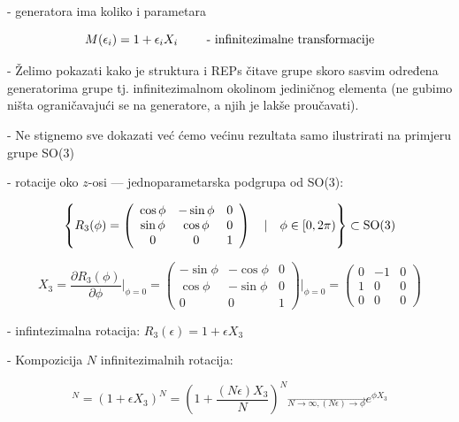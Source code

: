 - generatora ima koliko i parametara

\begin{displaymath}
  M(\epsilon_i)=1 + \epsilon_i X_i \qquad \textrm{ -
  infinitezimalne transformacije}
\end{displaymath}

- Želimo pokazati kako je struktura i REPs čitave grupe skoro sasvim
određena generatorima grupe tj. infinitezimalnom okolinom jediničnog 
elementa (ne gubimo ništa ograničavajući se na generatore, a njih
je lakše proučavati).

- Ne stignemo sve dokazati već ćemo većinu rezultata samo ilustrirati
  na primjeru grupe SO(3)


- rotacije oko $z$-osi --- jednoparametarska podgrupa od SO(3):

\begin{displaymath}
\left\{ R_3 (\phi) = \left( 
\begin{array}{ccc}
\cos\phi & -\sin\phi & 0 \\
\sin\phi & \cos\phi & 0 \\
0 & 0 & 1 
\end{array}
\right) \quad | \quad \phi \in [0, 2\pi) \right\} \subset \textrm{SO(3)}
\end{displaymath}

\begin{displaymath}
X_3 = \frac{\partial R_3 (\phi)}{\partial \phi}\Bigg|_{\phi=0}=
\left( \begin{array}{ccc}
-\sin\phi & -\cos\phi & 0 \\
\cos\phi & -\sin\phi & 0 \\
0 & 0 & 1 
\end{array} \right)\Bigg|_{\phi=0} =
\left( \begin{array}{ccc}
0 & -1 & 0 \\
1 & 0 & 0 \\
0 & 0 & 0 
\end{array} \right)
\end{displaymath}

- infintezimalna rotacija: $R_3 (\epsilon) = 1 + \epsilon X_3$

- Kompozicija $N$ infinitezimalnih rotacija:

\begin{displaymath}
[R_3(\epsilon)]^{N} = (1+\epsilon X_3)^N = \left(1+\frac{(N\epsilon)X_3}
 {N}\right)^N \stackrel{\longrightarrow}{_{N\to\infty, (N\epsilon)\to\phi}}
 e^{\phi X_3}
\end{displaymath}

